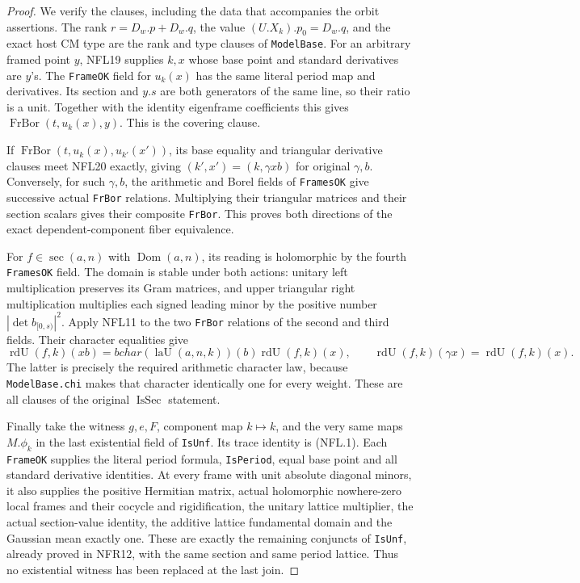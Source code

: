 \documentclass[11pt,a4paper]{article}
\numberwithin{equation}{section}
\theoremstyle{remark}\newtheorem{remark}[theorem]{Remark}
\begin{document}
\begin{proof}
We verify the clauses, including the data that accompanies the
orbit assertions.  The rank $r=D_w.p+D_w.q$, the value
$(U.X_k).p_0=D_w.q$, and the exact host CM type are the rank
and type clauses of \texttt{Model\allowbreak Base}.
For an arbitrary framed point $y$, NFL19 supplies $k,x$ whose
base point and standard derivatives are $y$'s.  The
\texttt{Frame\allowbreak OK} field for $u_k(x)$ has the same literal
period map and derivatives.  Its section and $y.s$ are both
generators of the same line, so their ratio is a unit.
Together with the identity eigenframe coefficients this gives
$\operatorname{FrBor}(t,u_k(x),y)$.  This is the covering clause.

If $\operatorname{FrBor}(t,u_k(x),u_{k'}(x'))$, its base equality
and triangular derivative clauses meet NFL20 exactly, giving
$(k',x')=(k,\gamma xb)$ for original $\gamma,b$.
Conversely, for such $\gamma,b$, the arithmetic and Borel
fields of \texttt{Frames\allowbreak OK} give successive actual
\texttt{Fr\allowbreak Bor} relations.  Multiplying their triangular
matrices and their section scalars gives their composite
\texttt{Fr\allowbreak Bor}.  This proves both directions of the exact
dependent-component fiber equivalence.

For $f\in\operatorname{sec}(a,n)$ with $\operatorname{Dom}(a,n)$,
its reading is holomorphic by the fourth \texttt{Frames\allowbreak OK}
field.  The domain is stable under both actions: unitary
left multiplication preserves its Gram matrices, and upper
triangular right multiplication multiplies each signed leading
minor by the positive number $|\det b_{[0,s)}|^2$.
Apply NFL11 to the two \texttt{Fr\allowbreak Bor} relations of the second
and third fields.  Their character equalities give
\[
 \operatorname{rdU}(f,k)(xb)=bchar(\operatorname{laU}(a,n,k))(b)
                              \operatorname{rdU}(f,k)(x),
 \qquad
 \operatorname{rdU}(f,k)(\gamma x)=\operatorname{rdU}(f,k)(x).
 \tag{NFL.28}
\]
The latter is precisely the required arithmetic character law,
because \texttt{Model\allowbreak Base.\allowbreak chi} makes that character identically
one for every weight.  These are all clauses of the original
$\operatorname{IsSec}$ statement.

Finally take the witness $g,e,F$, component map $k\mapsto k$,
and the very same maps $M.\phi_k$ in the last existential field
of \texttt{Is\allowbreak Unf}.  Its trace identity is (NFL.1).  Each
\texttt{Frame\allowbreak OK} supplies the literal period formula,
\texttt{Is\allowbreak Period}, equal base point and all standard derivative
identities.  At every frame with unit absolute diagonal minors,
it also supplies the positive Hermitian matrix, actual
holomorphic nowhere-zero local frames and their cocycle and
rigidification, the unitary lattice multiplier, the actual
section-value identity, the additive lattice fundamental
domain and the Gaussian mean exactly one.  These are exactly
the remaining conjuncts of \texttt{Is\allowbreak Unf}, already proved in
NFR12, with the same section and same period lattice.  Thus no
existential witness has been replaced at the last join.
\end{proof}
\end{document}
